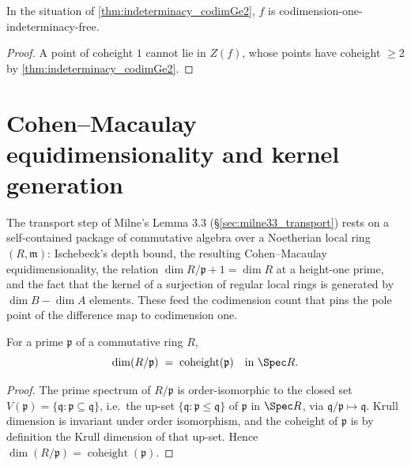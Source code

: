 \begin{corollary}
  \label{cor:codim_one_free_complete}
  \leanok
  In the situation of \ref{thm:indeterminacy_codimGe2}, \(f\) is
  codimension-one-indeterminacy-free.
\end{corollary}
\begin{proof}
  \leanok
  A point of coheight \(1\) cannot lie in \(Z(f)\), whose points have coheight
  \(\geq 2\) by \ref{thm:indeterminacy_codimGe2}.
\end{proof}

\section{Cohen--Macaulay equidimensionality and kernel generation}
\label{sec:cm_equidim}

The transport step of Milne's Lemma 3.3 (\S\ref{sec:milne33_transport}) rests on a
self-contained package of commutative algebra over a Noetherian local ring
\((R, \mathfrak m)\): Ischebeck's depth bound, the resulting Cohen--Macaulay
equidimensionality, the relation \(\dim R/\mathfrak p + 1 = \dim R\) at a
height-one prime, and the fact that the kernel of a surjection of regular local
rings is generated by \(\dim B - \dim A\) elements. These feed the codimension
count that pins the pole point of the difference map to codimension one.

\begin{lemma}
  \label{lem:ringKrullDim_quotient_eq_coheight}
  \leanok
  For a prime \(\mathfrak p\) of a commutative ring \(R\),
  \[
    \dim(R/\mathfrak p) \;=\; \operatorname{coheight}(\mathfrak p)
    \quad\text{in } \Spec R .
  \]
\end{lemma}
\begin{proof}
  \leanok
  The prime spectrum of \(R/\mathfrak p\) is order-isomorphic to the closed set
  \(V(\mathfrak p) = \{\mathfrak q : \mathfrak p \subseteq \mathfrak q\}\), i.e.\
  the up-set \(\{\mathfrak q : \mathfrak p \le \mathfrak q\}\) of \(\mathfrak p\)
  in \(\Spec R\), via \(\mathfrak q/\mathfrak p \mapsto \mathfrak q\). Krull
  dimension is invariant under order isomorphism, and the coheight of
  \(\mathfrak p\) is by definition the Krull dimension of that up-set. Hence
  \(\dim(R/\mathfrak p) = \operatorname{coheight}(\mathfrak p)\).
\end{proof}

